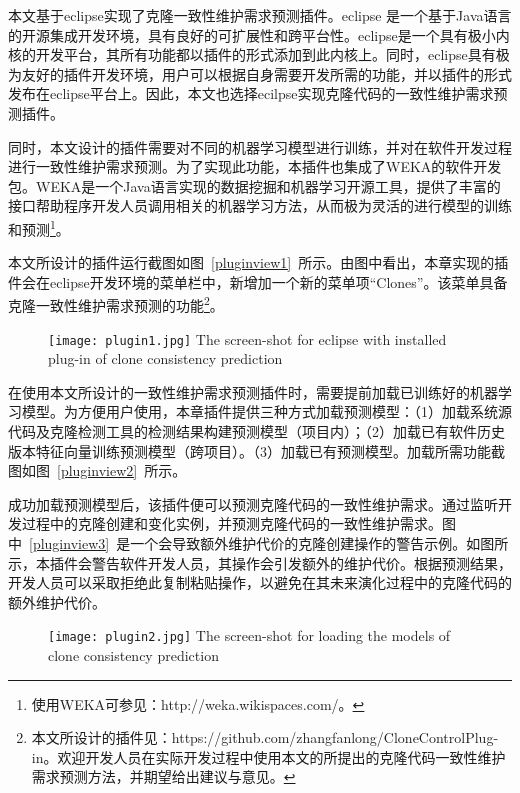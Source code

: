 本文基于eclipse实现了克隆一致性维护需求预测插件。eclipse 是一个基于Java语言的开源集成开发环境，具有良好的可扩展性和跨平台性。eclipse是一个具有极小内核的开发平台，其所有功能都以插件的形式添加到此内核上。同时，eclipse具有极为友好的插件开发环境，用户可以根据自身需要开发所需的功能，并以插件的形式发布在eclipse平台上。因此，本文也选择ecilpse实现克隆代码的一致性维护需求预测插件。

同时，本文设计的插件需要对不同的机器学习模型进行训练，并对在软件开发过程进行一致性维护需求预测。为了实现此功能，本插件也集成了WEKA的软件开发包。WEKA是一个Java语言实现的数据挖掘和机器学习开源工具，提供了丰富的接口帮助程序开发人员调用相关的机器学习方法，从而极为灵活的进行模型的训练和预测\footnote{使用WEKA可参见：http://weka.wikispaces.com/。}。

本文所设计的插件运行截图如图~\ref{pluginview1}~所示。由图中看出，本章实现的插件会在eclipse开发环境的菜单栏中，新增加一个新的菜单项“Clones”。该菜单具备克隆一致性维护需求预测的功能\footnote{本文所设计的插件见：https://github.com/zhangfanlong/CloneControlPlug-in。欢迎开发人员在实际开发过程中使用本文的所提出的克隆代码一致性维护需求预测方法，并期望给出建议与意见。}。

\begin{figure}[htbp]
\centering
\texttt{[image: plugin1.jpg]}
{The screen-shot for eclipse with installed plug-in of clone consistency prediction}
\vspace{-1em}
\end{figure}

在使用本文所设计的一致性维护需求预测插件时，需要提前加载已训练好的机器学习模型。为方便用户使用，本章插件提供三种方式加载预测模型：（1）加载系统源代码及克隆检测工具的检测结果构建预测模型（项目内）；（2）加载已有软件历史版本特征向量训练预测模型（跨项目）。（3）加载已有预测模型。加载所需功能截图如图~\ref{pluginview2}~所示。

成功加载预测模型后，该插件便可以预测克隆代码的一致性维护需求。通过监听开发过程中的克隆创建和变化实例，并预测克隆代码的一致性维护需求。图中~\ref{pluginview3}~是一个会导致额外维护代价的克隆创建操作的警告示例。如图所示，本插件会警告软件开发人员，其操作会引发额外的维护代价。根据预测结果，开发人员可以采取拒绝此复制粘贴操作，以避免在其未来演化过程中的克隆代码的额外维护代价。


\begin{figure}[h]
\centering
\texttt{[image: plugin2.jpg]}
{The screen-shot for loading the models of clone consistency prediction}
\vspace{-1em}
\end{figure}

